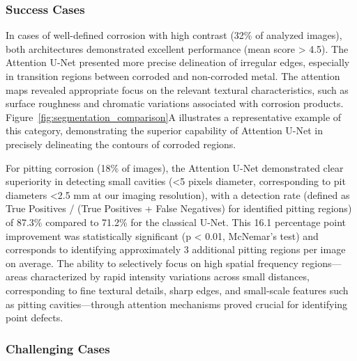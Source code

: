 \documentclass[Journal,letterpaper]{ascelike-new}
\begin{document}
\subsubsection{Success Cases}

In cases of well-defined corrosion with high contrast (32\% of analyzed images), both architectures demonstrated excellent performance (mean score > 4.5). The Attention U-Net presented more precise delineation of irregular edges, especially in transition regions between corroded and non-corroded metal. The attention maps revealed appropriate focus on the relevant textural characteristics, such as surface roughness and chromatic variations associated with corrosion products. Figure~\ref{fig:segmentation_comparison}A illustrates a representative example of this category, demonstrating the superior capability of Attention U-Net in precisely delineating the contours of corroded regions.

For pitting corrosion (18\% of images), the Attention U-Net demonstrated clear superiority in detecting small cavities (<5 pixels diameter, corresponding to pit diameters <2.5 mm at our imaging resolution), with a detection rate (defined as True Positives / (True Positives + False Negatives) for identified pitting regions) of 87.3\% compared to 71.2\% for the classical U-Net. This 16.1 percentage point improvement was statistically significant (p < 0.01, McNemar's test) and corresponds to identifying approximately 3 additional pitting regions per image on average. The ability to selectively focus on high spatial frequency regions---areas characterized by rapid intensity variations across small distances, corresponding to fine textural details, sharp edges, and small-scale features such as pitting cavities---through attention mechanisms proved crucial for identifying point defects.

\subsubsection{Challenging Cases}
\end{document}
